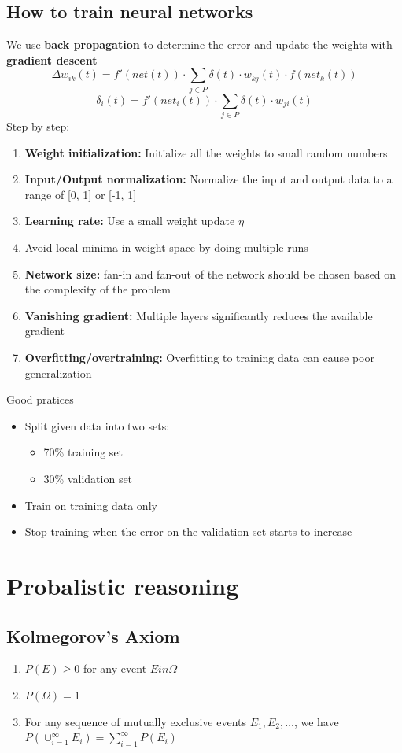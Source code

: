 \documentclass[12pt,a4paper]{article}
\begin{document}
\subsection{How to train neural networks}
We use \textbf{back propagation} to determine the error and update the weights with \textbf{gradient descent}
\[
\Delta w_{ik}(t) = f'(net(t)) \cdot \sum_{j \in P} \delta (t) \cdot w_{kj}(t) \cdot f(net_{k}(t))
\]
\[
\delta_i (t) = f'(net_i (t)) \cdot \sum_{j \in P} \delta (t) \cdot w_{ji}(t)
\]
Step by step:
\begin{enumerate}
    \item \textbf{Weight initialization:} Initialize all the weights to small random numbers
    \item \textbf{Input/Output normalization:} Normalize the input and output data to a range of [0, 1] or [-1, 1]
    \item \textbf{Learning rate:} Use a small weight update $\eta$
    \item Avoid local minima in weight space by doing multiple runs
    \item \textbf{Network size:} fan-in and fan-out of the network should be chosen based on the complexity of the problem
    \item \textbf{Vanishing gradient:} Multiple layers significantly reduces the available gradient
    \item \textbf{Overfitting/overtraining:} Overfitting to training data can cause poor generalization
\end{enumerate}
Good pratices
\begin{itemize}
    \item Split given data into two sets:
    \begin{itemize}
        \item 70\% training set
        \item 30\% validation set
    \end{itemize}
    \item Train on training data only 
    \item Stop training when the error on the validation set starts to increase
\end{itemize}

\section{Probalistic reasoning}
\subsection{Kolmegorov's Axiom}
\begin{enumerate}
    \item $P(E) \geq 0$ for any event $E in \Omega$
    \item $P(\Omega) = 1$
    \item For any sequence of mutually exclusive events $E_1, E_2, \ldots$, we have $P(\cup_{i=1}^{\infty} E_i) = \sum_{i=1}^{\infty} P(E_i)$
\end{enumerate}
\end{document}
